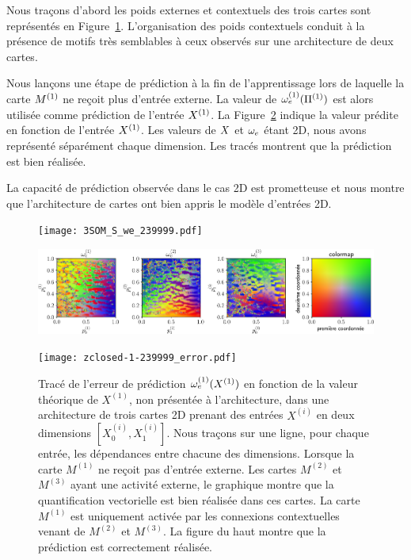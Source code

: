 \documentclass[../main]{subfiles}
\begin{document}
Nous traçons d'abord les poids externes et contextuels des trois cartes sont représentés en Figure~\ref{fig:3som_w}.
L'organisation des poids contextuels conduit à la présence de motifs très semblables à ceux observés sur une architecture de deux cartes.

Nous lançons une étape de prédiction à la fin de l'apprentissage lors de laquelle la carte $M^{({1})}$ ne reçoit plus d'entrée externe. 
La valeur de $\omega_{e}^{({1})}(\Pi^{({1})})$ est alors utilisée comme prédiction de l'entrée $X^{({1})}$.
La Figure~\ref{fig:3som_pred} indique la valeur prédite en fonction de l'entrée $X^{({1})}$. 
Les valeurs de $X$ et $\omega_e$ étant 2D, nous avons représenté séparément chaque dimension. 
Les tracés montrent que la prédiction est bien réalisée.

La capacité de prédiction observée dans le cas 2D est prometteuse et nous montre que l'architecture de cartes ont bien appris le modèle d'entrées 2D.

\begin{figure}
	\begin{minipage}{\textwidth}
		\centering\texttt{[image: 3SOM\_S\_we\_239999.pdf]}
	\end{minipage}
	\begin{minipage}{\textwidth}
		\includegraphics[width=\textwidth]{3SOM_S_wc_239999.pdf}
		\caption{\label{fig:3som_w}}
	\end{minipage}
\end{figure}

\begin{figure}
\texttt{[image: zclosed-1-239999\_error.pdf]}
\caption{Tracé de l'erreur de prédiction $\omega_e^{({1})}(X^{({1})})$ en fonction de la valeur théorique de $X^{(1)}$, non présentée à l'architecture, dans une architecture de trois cartes 2D prenant des entrées $X^{(i)}$ en deux dimensions $[X^{(i)}_0, X^{(i)}_1]$. Nous traçons sur une ligne, pour chaque entrée, les dépendances entre chacune des dimensions.
Lorsque la carte $M^{(1)}$ ne reçoit pas d'entrée externe. Les cartes $M^{(2)}$ et $M^{(3)}$ ayant une activité externe, le graphique montre que la quantification vectorielle est bien réalisée dans ces cartes. La carte $M^{(1)}$ est uniquement activée par les connexions contextuelles venant de $M^{(2)}$ et $M^{(3)}$. La figure du haut montre que la prédiction est correctement réalisée.\label{fig:3som_pred}}
\end{figure}
\end{document}

